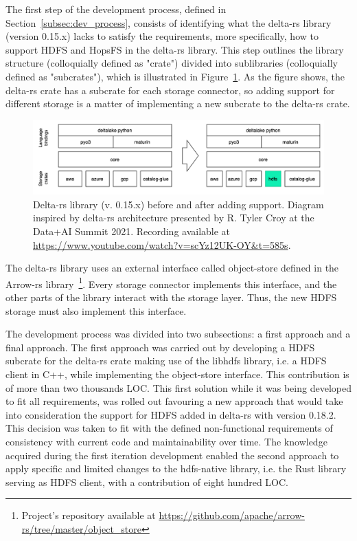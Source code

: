 
The first step of the development process, defined in Section~\ref{subsec:dev_process}, consists of identifying what the delta-rs library (version 0.15.x) lacks to satisfy the requirements, more specifically, how to support \gls{HDFS} and \gls{HopsFS} in the delta-rs library. This step outlines the library structure (colloquially defined as "crate") divided into sublibraries (colloquially defined as "subcrates"), which is illustrated in Figure~\ref{fig:delta-rs_schema}. As the figure shows, the delta-rs crate has a subcrate for each storage connector, so adding support for different storage is a matter of implementing a new subcrate to the delta-rs crate.

\begin{figure}[!ht]
    \begin{center}
      \includegraphics[width=\textwidth]{figures/4-implementation/delta-rs_schema.png}
    \caption[Delta-rs architecture before and after implementation]{Delta-rs library (v. 0.15.x) before and after adding  support. Diagram inspired by delta-rs architecture presented by R. Tyler Croy at the Data+AI Summit 2021. Recording available at \url{https://www.youtube.com/watch?v=scYz12UK-OY&t=585s}.}
    \label{fig:delta-rs_schema}
    \end{center}
\end{figure}

The delta-rs library uses an external interface called object-store defined in the Arrow-rs library~\footnote{Project's repository available at \url{https://github.com/apache/arrow-rs/tree/master/object_store}}. Every storage connector implements this interface, and the other parts of the library interact with the storage layer. Thus, the new \gls{HDFS} storage must also implement this interface.

The development process was divided into two subsections: a first approach and a final approach. The first approach was carried out by developing a \gls{HDFS} subcrate for the delta-rs crate making use of the libhdfs library, i.e. a \gls{HDFS} client in C++, while implementing the object-store interface. This contribution is of more than two thousands \gls{LOC}. This first solution while it was being developed to fit all requirements, was rolled out favouring a new approach that would take into consideration the support for \gls{HDFS} added in delta-rs with version 0.18.2. This decision was taken to fit with the defined non-functional requirements of consistency with current code and maintainability over time. The knowledge acquired during the first iteration development enabled the second approach to apply specific and limited changes to the hdfs-native library, i.e. the Rust library serving as \gls{HDFS} client, with a contribution of eight hundred \gls{LOC}.  

